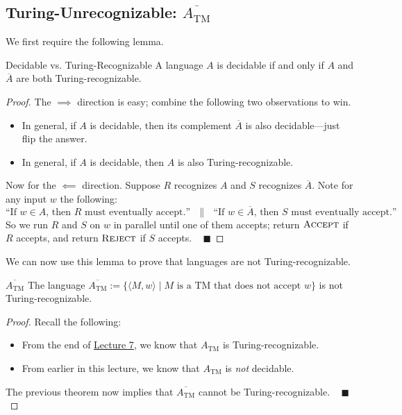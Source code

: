 \subsection{Turing-Unrecognizable:
$\overline{A_{\mathrm{TM}}}$}

We first require the following lemma.

\begin{theorem}{Decidable vs. Turing-Recognizable}
    A language $A$ is decidable
    if and only if $A$ and $\overline{A}$
    are both Turing-recognizable.
\end{theorem}

\begin{proof}
    The $\implies$ direction is easy;
    combine the following two observations to win.
    \begin{itemize}
        \item In general, if $A$ is decidable,
        then its complement $\overline{A}$ is also decidable---just
        flip the answer.
        \item In general, if $A$ is decidable,
        then $A$ is also Turing-recognizable.
    \end{itemize}
    Now for the $\impliedby$ direction.
    Suppose $R$ recognizes $A$ and $S$ recognizes $\overline{A}$.
    Note for any input $w$ the following:
    \[
    \text{``If $w \in A$, then $R$ must eventually accept.''}
    ~~~ \parallel ~~~
    \text{``If $w \in \overline{A}$, then $S$ must eventually accept.''}
    \]
    So we run $R$ and $S$ on $w$ in parallel
    until one of them accepts;
    return $\textsc{Accept}$ if $R$ accepts,
    and return $\textsc{Reject}$ if $S$ accepts. ~ $\blacksquare$
\end{proof}

We can now use this lemma to prove that languages are not Turing-recognizable.

\begin{theorem}{$\overline{A_{\mathrm{TM}}}$}
    The language
    $\overline{A_{\mathrm{TM}}} := \{\langle M, w \rangle \mid
    M \text{ is a TM that does not accept } w\}$
    is not Turing-recognizable.
\end{theorem}

\begin{proof}
    Recall the following:
    \begin{itemize}
        \item From the end of
        \href{/18.404/lectures/7/#algorithms-on-grammars-and-turing-machines-a-cfg-e-cfg-eq-cfg-a-tm}{Lecture 7},
        we know that $A_{\mathrm{TM}}$ is Turing-recognizable.
        \item From earlier in this lecture,
        we know that $A_{\mathrm{TM}}$ is \emph{not} decidable.
    \end{itemize}
    The previous theorem now implies
    that $\overline{A_{\mathrm{TM}}}$ cannot be Turing-recognizable.
    ~ $\blacksquare$
\end{proof}

